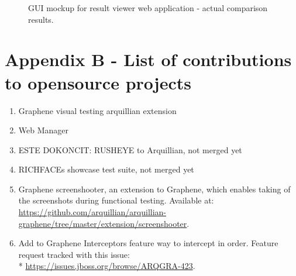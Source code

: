 \documentclass[11pt,oneside,final]{fithesis2}
\begin{document}
\begin{figure}[!htb]
    \begin{center}
    \leavevmode
    \centerline{}
    \end{center}
    \caption{GUI mockup for result viewer web application - actual comparison results.}
    \label{fig:comparisonResultMock}
\end{figure}

\chapter{Appendix B - List of contributions to opensource projects}
\label{appendix:b}
\begin{enumerate}
 \item Graphene visual testing arquillian extension
 \item Web Manager
 \item ESTE DOKONCIT: RUSHEYE to Arquillian, not merged yet
 \item RICHFACEs showcase test suite, not merged yet
 \item Graphene screenshooter, an extension to Graphene, which enables taking of the screenshots during functional testing.
       Available at: \url{https://github.com/arquillian/arquillian-graphene/tree/master/extension/screenshooter}.
 \item Add to Graphene Interceptors feature way to intercept in order. Feature request tracked with this issue:\\*
       \url{https://issues.jboss.org/browse/ARQGRA-423}.
\end{enumerate}
\end{document}
